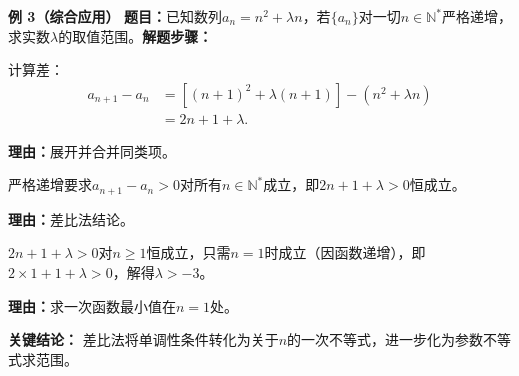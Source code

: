 \begin{examplebox}
	\medskip
	\textbf{\textcolor{CExample}{例 3（综合应用）}}
	\textbf{\textcolor{CExample}{题目：}}已知数列$a_n = n^2 + \lambda n$，若$\{a_n\}$对一切$n\in\mathbb{N}^*$严格递增，求实数$\lambda$的取值范围。\textbf{\textcolor{CExample}{解题步骤：}}
	\begin{description}[style=nextline, leftmargin=2.8em, labelsep=0.5em, itemsep=0.45em]
		\item[\textbf{第一步（作差化简）：}]
			计算差：
			\[
				\begin{aligned}
					a_{n+1}-a_n &= [(n+1)^2+\lambda(n+1)] - (n^2+\lambda n) \\ &= 2n+1+\lambda.
			\end{aligned}
			\]
			\par\textbf{理由：}展开并合并同类项。
		\item[\textbf{第二步（建立条件）：}]
			严格递增要求$a_{n+1}-a_n > 0$对所有$n\in\mathbb{N}^*$成立，即$2n+1+\lambda > 0$恒成立。
			\par\textbf{理由：}差比法结论。
		\item[\textbf{第三步（求参数范围）：}]
			$2n+1+\lambda > 0$对$n\ge 1$恒成立，只需$n=1$时成立（因函数递增），即$2\times 1+1+\lambda >0$，解得$\lambda > -3$。
			\par\textbf{理由：}求一次函数最小值在$n=1$处。
	\end{description}
	\textbf{\textcolor{CExample}{关键结论：}}
	差比法将单调性条件转化为关于$n$的一次不等式，进一步化为参数不等式求范围。
\end{examplebox}
